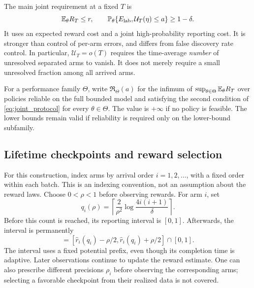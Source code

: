 \documentclass[11pt]{article}
\begin{document}
The main joint requirement at a fixed $T$ is
\begin{equation}
 \mathbb E_\theta R_T\le r,\qquad
 \mathbb P_\theta\{E_{\rm lab},\mathcal U_T(\eta)\le a\}\ge1-\delta.
 \label{eq:joint_protocol}
\end{equation}
It uses an expected reward cost and a joint high-probability reporting cost.
It is stronger than control of per-arm errors, and differs from false discovery
rate control. In particular, $\mathcal U_T=o(T)$ requires the time-average
\emph{number} of unresolved separated arms to vanish. It does not merely
require a small unresolved fraction among all arrived arms.

For a performance family $\Theta$, write $\mathfrak R_\Theta(a)$ for the
infimum of $\sup_{\theta\in\Theta}\mathbb E_\theta R_T$ over policies reliable on the
full bounded model and satisfying the second condition of
\eqref{eq:joint_protocol} for every $\theta\in\Theta$. The value is $+\infty$
if no policy is feasible. The lower bounds remain valid if reliability is
required only on the lower-bound subfamily.


\subsection{Lifetime checkpoints and reward selection}
\label{sec:method}

For this construction, index arms by arrival order $i=1,2,\ldots$,
with a fixed order within each batch. This is an indexing convention,
not an assumption about the reward laws.
Choose $0<\rho<1$ before observing rewards. For arm $i$, set
\begin{equation}
 q_i(\rho)=\left\lceil\frac2{\rho^2}
                  \log\frac{4i(i+1)}\delta\right\rceil.
 \label{eq:checkpoint}
\end{equation}
Before this count is reached, its reporting interval is $[0,1]$. Afterwards,
the interval is permanently
\begin{equation}
 [\ell_i,u_i]=[\hat r_i(q_i)-\rho/2,
                 \hat r_i(q_i)+\rho/2]\cap[0,1].
 \label{eq:fixed_interval}
\end{equation}
The interval uses a fixed potential prefix, even though its completion time is
adaptive. Later observations continue to update the reward estimate. One can
also prescribe different precisions $\rho_i$ before observing the corresponding
arms; selecting a favorable checkpoint from their realized data is not covered.
\end{document}

